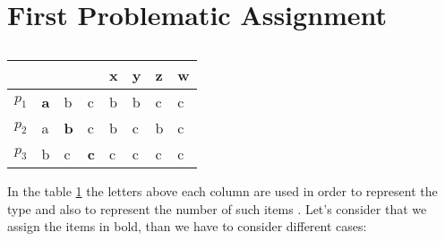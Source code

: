 \section{First Problematic Assignment}
\begin{table}[h]
\centering
\begin{tabular}{|l|l|l|l||l|l|l|l|}
\hline
      &            &            &            & x & y & z & w \\ \hline
$p_1$ & \textbf{a} & b          & c          & b & b & c & c \\ \hline
$p_2$ & a          & \textbf{b} & c          & b & c & b & c \\ \hline
$p_3$ & b          & c          & \textbf{c} & c & c & c & c \\ \hline
\end{tabular}
\caption{}
\label{table-3-players-aab}
\end{table}
In the table \ref{table-3-players-aab} the letters above each column are used in order to represent the type and also to represent the number of such items . Let's consider that we assign the items in bold, than we have to consider different cases:

